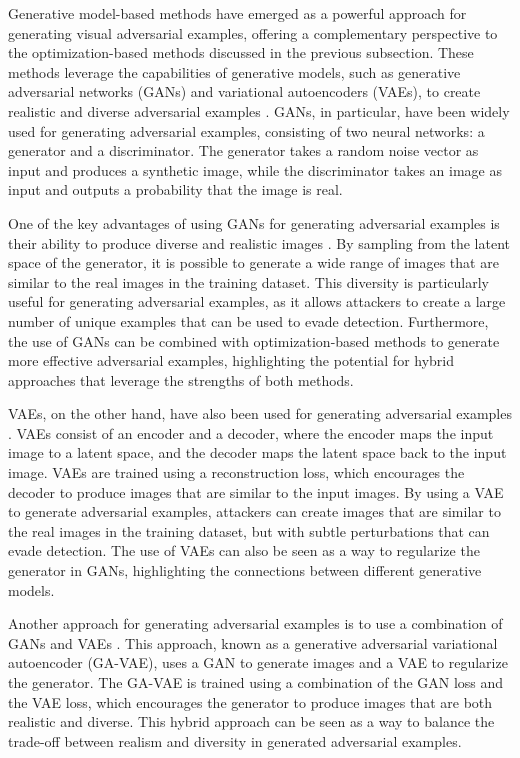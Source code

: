 \documentclass[11pt]{article}
\begin{document}
Generative model-based methods have emerged as a powerful approach for generating visual adversarial examples, offering a complementary perspective to the optimization-based methods discussed in the previous subsection. These methods leverage the capabilities of generative models, such as generative adversarial networks (GANs) and variational autoencoders (VAEs), to create realistic and diverse adversarial examples \cite{ref65}. GANs, in particular, have been widely used for generating adversarial examples, consisting of two neural networks: a generator and a discriminator. The generator takes a random noise vector as input and produces a synthetic image, while the discriminator takes an image as input and outputs a probability that the image is real.

One of the key advantages of using GANs for generating adversarial examples is their ability to produce diverse and realistic images \cite{ref66}. By sampling from the latent space of the generator, it is possible to generate a wide range of images that are similar to the real images in the training dataset. This diversity is particularly useful for generating adversarial examples, as it allows attackers to create a large number of unique examples that can be used to evade detection. Furthermore, the use of GANs can be combined with optimization-based methods to generate more effective adversarial examples, highlighting the potential for hybrid approaches that leverage the strengths of both methods.

VAEs, on the other hand, have also been used for generating adversarial examples \cite{ref67}. VAEs consist of an encoder and a decoder, where the encoder maps the input image to a latent space, and the decoder maps the latent space back to the input image. VAEs are trained using a reconstruction loss, which encourages the decoder to produce images that are similar to the input images. By using a VAE to generate adversarial examples, attackers can create images that are similar to the real images in the training dataset, but with subtle perturbations that can evade detection. The use of VAEs can also be seen as a way to regularize the generator in GANs, highlighting the connections between different generative models.

Another approach for generating adversarial examples is to use a combination of GANs and VAEs \cite{ref68}. This approach, known as a generative adversarial variational autoencoder (GA-VAE), uses a GAN to generate images and a VAE to regularize the generator. The GA-VAE is trained using a combination of the GAN loss and the VAE loss, which encourages the generator to produce images that are both realistic and diverse. This hybrid approach can be seen as a way to balance the trade-off between realism and diversity in generated adversarial examples.
\end{document}
